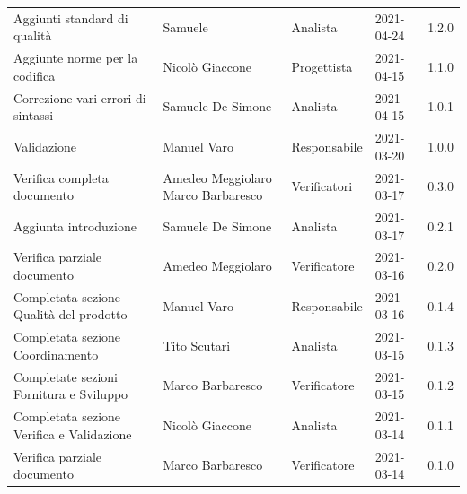 \documentclass[a4paper]{article}
\begin{document}
\begin{center}
\begin{longtable}[!h]{p{160px} p{80px} p{70px} p{55px} p{40px}}
        Aggiunti standard di qualità                                               & Samuele                                     & Analista       & 2021-04-24    & 1.2.0             \\
        Aggiunte norme per la codifica                                             & Nicolò Giaccone                             & Progettista    & 2021-04-15    & 1.1.0             \\
        Correzione vari errori di sintassi                                         & Samuele De Simone                           & Analista       & 2021-04-15    & 1.0.1             \\
        Validazione                                                                & Manuel Varo                                 & Responsabile   & 2021-03-20    & 1.0.0             \\
        Verifica completa documento                                                & Amedeo Meggiolaro \newline Marco Barbaresco & Verificatori   & 2021-03-17    & 0.3.0             \\
        Aggiunta introduzione                                                      & Samuele De Simone                           & Analista       & 2021-03-17    & 0.2.1             \\
        Verifica parziale documento                                                & Amedeo Meggiolaro                           & Verificatore   & 2021-03-16    & 0.2.0             \\
        Completata sezione Qualità del prodotto                                    & Manuel Varo                                 & Responsabile   & 2021-03-16    & 0.1.4             \\
        Completata sezione Coordinamento                                           & Tito Scutari                                & Analista       & 2021-03-15    & 0.1.3             \\
        Completate sezioni Fornitura e Sviluppo                                    & Marco Barbaresco                            & Verificatore   & 2021-03-15    & 0.1.2             \\
        Completata sezione Verifica e Validazione                                  & Nicolò Giaccone                             & Analista       & 2021-03-14    & 0.1.1             \\
        Verifica parziale documento                                                & Marco Barbaresco                            & Verificatore   & 2021-03-14    & 0.1.0             \\

\end{longtable}
\end{center}
\end{document}

